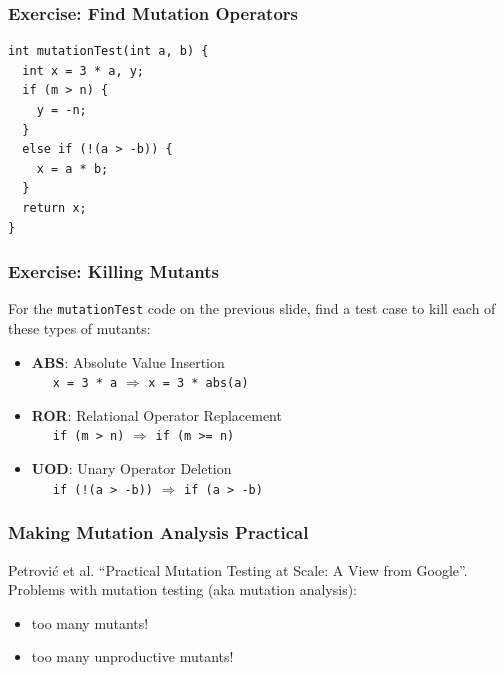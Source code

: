 \documentclass{beamer}
\newenvironment{changemargin}[1]{%
  \begin{list}{}{%
    \setlength{\topsep}{0pt}%
    \setlength{\leftmargin}{#1}%
    \setlength{\rightmargin}{1em}
    \setlength{\listparindent}{\parindent}%
    \setlength{\itemindent}{\parindent}%
    \setlength{\parsep}{\parskip}%
  }%
  \item[]}{\end{list}}
\begin{document}
\begin{frame}[fragile]
  \frametitle{Exercise: Find Mutation Operators}

  \begin{changemargin}{2em}
\begin{lstlisting}
int mutationTest(int a, b) { 
  int x = 3 * a, y;
  if (m > n) {
    y = -n;
  }
  else if (!(a > -b)) {
    x = a * b;
  }
  return x;
}
\end{lstlisting}
  \end{changemargin}
  
\end{frame}

\begin{frame}[fragile]
  \frametitle{Exercise: Killing Mutants}

  \begin{changemargin}{2em}
    For the \texttt{mutationTest} code on the previous slide, find a test case to kill each of these types of mutants:\\[0.5em]
    \begin{itemize}
\item {\bf ABS}: Absolute Value Insertion\\
~~~{\tt x = 3 * a}
$\Longrightarrow$ {\tt x = 3 * abs(a)}\\[.5em]
\item {\bf ROR}: Relational Operator Replacement\\
~~~{\tt if (m > n)} $\Longrightarrow$ {\tt if (m >= n)}\\[.5em]
\item {\bf UOD}: Unary Operator Deletion\\
~~~{\tt if (!(a > -b))} $\Longrightarrow$ {\tt if (a > -b)}\\[.5em]
    \end{itemize}
  \end{changemargin}
\end{frame}


\begin{frame}
  \frametitle{Making Mutation Analysis Practical}

  \large
  \begin{changemargin}{2em}
  Petrović et al. ``Practical Mutation Testing at Scale: A View from Google''.\\[1em]

  Problems with mutation testing (aka mutation analysis):
  \begin{itemize}
  \item too many mutants!
  \item too many unproductive mutants!
  \end{itemize}
  \end{changemargin}
\end{frame}
\end{document}
